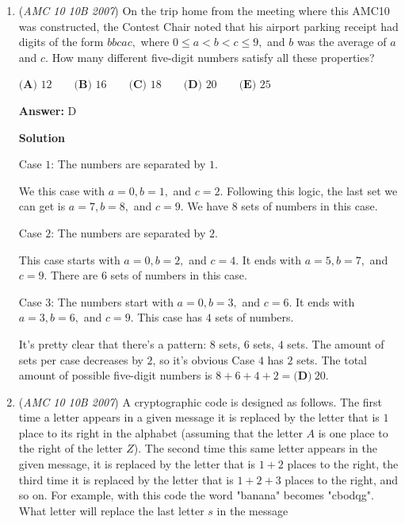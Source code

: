 \begin{enumerate}
$AB = EC$ because they are opposite sides of a square. Also, $ED = DC = AB$ because all sides of the convex pentagon are of equal length. Since $ABCE$ is a square and $\triangle CED$ is an equilateral triangle, $\angle AEC = 90$ and $\angle CED = 60.$ Use angle addition:
 \[\angle E = \angle AEC + \angle CED = 90 + 60 = \boxed{\textbf{(E)} 150}\]



	\item (\textit{AMC 10 10B 2007}) On the trip home from the meeting where this AMC10 was constructed, the Contest Chair noted that his airport parking receipt had digits of the form $bbcac,$ where $0 \le a < b < c \le 9,$ and $b$ was the average of $a$ and $c.$ How many different five-digit numbers satisfy all these properties?


 $\textbf{(A) } 12 \qquad\textbf{(B) } 16 \qquad\textbf{(C) } 18 \qquad\textbf{(D) } 20 \qquad\textbf{(E) } 25$

 \textbf{Answer: }D



\textbf{Solution}

Case $1$: The numbers are separated by $1$.

 We this case with $a=0, b=1,$ and $c=2$. Following this logic, the last set we can get is $a=7, b=8,$ and $c=9$. We have $8$ sets of numbers in this case.

 
Case $2$: The numbers are separated by $2$.

 This case starts with $a=0, b=2,$ and $c=4$. It ends with $a=5, b=7,$ and $c=9$. There are $6$ sets of numbers in this case.

 
Case $3$: The numbers start with $a=0, b=3,$ and $c=6$. It ends with $a=3, b=6,$ and $c=9$. This case has $4$ sets of numbers.

 It's pretty clear that there's a pattern: $8$ sets, $6$ sets, $4$ sets. The amount of sets per case decreases by $2$, so it's obvious Case $4$ has $2$ sets. The total amount of possible five-digit numbers is $8+6+4+2=\boxed{\textbf{(D)}\ 20}$.

 


	\item (\textit{AMC 10 10B 2007}) A cryptographic code is designed as follows. The first time a letter appears in a given message it is replaced by the letter that is $1$ place to its right in the alphabet (assuming that the letter $A$ is one place to the right of the letter $Z$). The second time this same letter appears in the given message, it is replaced by the letter that is $1+2$ places to the right, the third time it is replaced by the letter that is $1+2+3$ places to the right, and so on. For example, with this code the word "banana" becomes "cbodqg". What letter will replace the last letter $s$ in the message


\end{enumerate}
